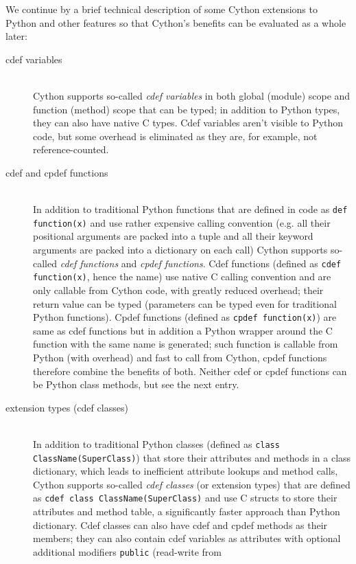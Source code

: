 We continue by a brief technical description of some Cython extensions to Python and other features
so that Cython's benefits can be evaluated as a whole later:
\begin{description}
	\item[cdef variables] \hfill \\
		Cython supports so-called \emph{cdef variables} in both global (module) scope and function
		(method) scope that can be typed; in addition to Python types, they can also have native
		C types. Cdef variables aren't visible to Python code, but some overhead is eliminated as they
		are, for example, not reference-counted.
	\item[cdef and cpdef functions] \hfill \\
		In addition to traditional Python functions that are defined in code as \verb|def function(x)|
		and use rather expensive calling convention (e.g. all their positional arguments are packed
		into a tuple and all their keyword arguments are packed into a dictionary on each call)
		Cython supports so-called \emph{cdef functions} and \emph{cpdef functions}. Cdef functions
		(defined as \verb|cdef function(x)|, hence the name) use native C calling convention and
		are only callable from Cython code, with greatly reduced overhead; their return value can
		be typed (parameters can be typed even for traditional Python functions). Cpdef functions
		(defined as \verb|cpdef function(x)|) are same as cdef functions but in addition a Python
		wrapper around the C function with the same name is generated; such function is callable
		from Python (with overhead) and fast to call from Cython, cpdef functions therefore combine
		the benefits of both.
		Neither cdef or cpdef functions can be Python class methods, but see the next entry.
	\item[extension types (cdef classes)] \hfill \\
		In addition to traditional Python classes (defined as \verb|class ClassName(SuperClass)|) that
		store their attributes and methods in a class dictionary, which leads to inefficient attribute
		lookups and method calls, Cython supports so-called \emph{cdef classes} (or extension types)
		that are defined as \verb|cdef class ClassName(SuperClass)| and use C structs to store their
		attributes and method table, a significantly faster approach than Python dictionary. Cdef
		classes can also have cdef and cpdef methods as their members; they can also contain cdef
		variables as attributes with optional additional modifiers \verb|public| (read-write from

\end{description}
